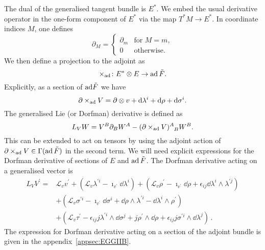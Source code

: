 \documentclass[debug]{phd}
\begin{document}
						The dual of the generalised tangent bundle is $E^{*}$. 
						We embed the usual derivative operator in the one-form component of $E^{*}$ via the map $T^{*}M \rightarrow E^{*}$. 
						In coordinate indices $M$, one defines
								\begin{equation}
									\partial_{M}=	\begin{cases}
													\partial_{m} & \text{for }M=m,\\
													0 & \text{otherwise}.
												\end{cases}
								\end{equation}
						We then define a projection to the adjoint as
								\begin{equation}
									\times_{\mathrm{ad}} \colon E^{*} \otimes E \rightarrow \operatorname{ad} \tilde{F}.
								\end{equation}
						Explicitly, as a section of $\mathrm{ad} \tilde{F}$ we have
								\begin{equation}\label{eq:del-ad-IIB}
									\partial \times_{\mathrm{ad}} V =\partial \otimes v + \mathrm{d}\lambda^{i}+\mathrm{d}\rho+\mathrm{d}\sigma^{i}.
								\end{equation}
						The generalised Lie (or Dorfman) derivative is defined as
								\begin{equation}\label{eq:Dorf-def-IIB}
									L_{V}W=V^{B}\partial_{B}W^{A}-(\partial\times_{\mathrm{ad}} V)_{\phantom{A}B}^{A}W^{B}.
								\end{equation}
						This can be extended to act on tensors by using the adjoint action of $\partial\times_{\mathrm{ad}} V\in\Gamma(\operatorname{ad}\tilde{F})$ in the second term. 
						We will need explicit expressions for the Dorfman derivative of sections of $E$ and $\operatorname{ad} \tilde{F}$. 
						The Dorfman derivative acting on a generalised vector is
								\begin{equation}\label{eq:IIB_Dorf_vector}
									\begin{split}
										L_{V}V^{\prime} =& \mathcal{L}_{v}v^{\prime}+(\mathcal{L}_{v}\lambda^{\prime i}-\imath_{v^{\prime}}\dd\lambda^{i})+(\mathcal{L}_{v}\rho^{\prime}-\imath_{v^{\prime}}\dd\rho+\epsilon_{ij}\dd\lambda^{i}\wedge\lambda^{\prime j}) \\
 														& +(\mathcal{L}_{v}\sigma^{\prime i}-\imath_{v^{\prime}}\dd\sigma^{i}+\dd\rho\wedge\lambda^{\prime i}-\dd\lambda^{i}\wedge\rho^{\prime})\\
 														& +(\mathcal{L}_{v}\tau^{\prime}-\epsilon_{ij}j\lambda^{\prime i}\wedge\dd\sigma^{j}+j\rho^{\prime}\wedge\dd\rho+\epsilon_{ij}j\sigma^{\prime i}\wedge\dd\lambda^{j})\, .
									\end{split}
								\end{equation}
						The expression for Dorfman derivative acting on a section of the adjoint bundle is given in the appendix~\ref{appsec:EGGIIB}.
					
\end{document}
